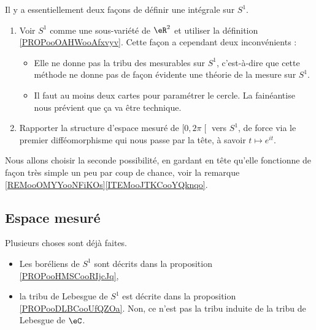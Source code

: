Il y a essentiellement deux façons de définir une intégrale sur \( S^1\).
\begin{enumerate}
	\item Voir \( S^1\) comme une sous-variété de \( \eR^2\) et utiliser la définition \ref{PROPooOAHWooAfxvyv}. Cette façon a cependant deux inconvénients :
	      \begin{itemize}
		      \item Elle ne donne pas la tribu des mesurables sur \( S^1\), c'est-à-dire que cette méthode ne donne pas de façon évidente une théorie de la mesure sur \( S^1\).
		      \item Il faut au moins deux cartes pour paramétrer le cercle. La fainéantise nous prévient que ça va être technique.
	      \end{itemize}
	\item
	      Rapporter la structure d'espace mesuré de \( \mathopen[ 0 , 2\pi \mathclose[\) vers \( S^1\), de force via le premier difféomorphisme qui nous passe par la tête, à savoir \( t\mapsto  e^{it}\).
\end{enumerate}
Nous allons choisir la seconde possibilité, en gardant en tête qu'elle fonctionne de façon très simple un peu par coup de chance, voir la remarque \ref{REMooOMYYooNFiKOs}\ref{ITEMooJTKCooYQknqo}.

\subsection{Espace mesuré}

Plusieurs choses sont déjà faites.
\begin{itemize}
	\item Les boréliens de \( S^1\) sont décrits dans la proposition \ref{PROPooHMSCooRIjcJq},
	\item la tribu de Lebesgue de \( S^1\) est décrite dans la proposition \ref{PROPooDLBCooUfQZOa}. Non, ce n'est pas la tribu induite de la tribu de Lebesgue de \( \eC\).
\end{itemize}

